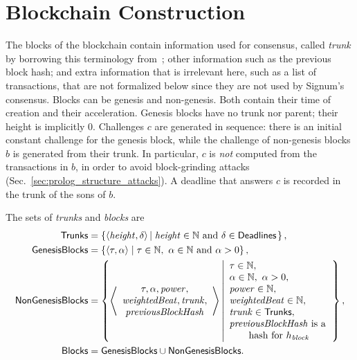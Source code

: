 \section{Blockchain Construction}\label{sec:blockchain_construction}

The blocks of the blockchain contain information used for consensus,
called \emph{trunk} by borrowing this terminology from~\cite{CohenP19};
other information such as the previous block hash;
and extra information that is irrelevant here, such as a list of transactions,
that are not formalized below since they are not used by Signum's consensus.
Blocks can be genesis and non-genesis. Both contain their time of creation and their acceleration.
Genesis blocks have no trunk nor parent; their height is implicitly $0$.
Challenges $c$ are generated in sequence: there is an initial constant challenge for the genesis
block, while the challenge of non-genesis blocks $b$ is generated from their trunk.
In particular, $c$ is \emph{not} computed from the transactions in $b$,
in order to avoid block-grinding attacks (Sec.~\ref{sec:prolog_structure_attacks}).
A deadline that answers $c$ is recorded in the trunk of the sons of $b$.
%
\begin{definition}\label{def:trunk}
  The sets of \emph{trunks} and \emph{blocks} are
  \begin{align*}
    \Trunks&=\left\{\langle\height,\delta\rangle\left|\;\height\in\mathbb{N}\text{ and }\delta\in\Deadlines\right.\right\},\\
    \GenesisBlocks&=\left\{\langle\tau,\alpha\rangle\mid\tau\in\mathbb{N},\ \alpha\in\mathbb{N}\text{ and }\alpha>0\right\},\\
    \NonGenesisBlocks&=\left\{\left\langle\begin{array}{c}
    \tau,\alpha,\power,\\
    \weightedbeat,\trunk,\\
    \previousblockhash
    \end{array}\right\rangle\left|\begin{array}{l}
    \tau\in\mathbb{N},\\
    \alpha\in\mathbb{N},\ \alpha>0,\\
    \power\in\mathbb{N},\\
    \weightedbeat\in\mathbb{N},\\
    \trunk\in\Trunks,\\
    \previousblockhash\text{ is a}\\
    \qquad\text{hash for $h_\block$}
    \end{array}\right.\right\},\\
    \Blocks&=\GenesisBlocks\cup\NonGenesisBlocks.
  \end{align*}
\end{definition}
